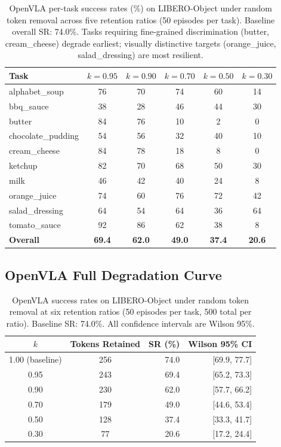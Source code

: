 \begin{table}[ht]
\centering
\small
\caption{OpenVLA per-task success rates (\%) on LIBERO-Object under random token removal across five retention ratios (50 episodes per task). Baseline overall SR: 74.0\%. Tasks requiring fine-grained discrimination (butter, cream\_cheese) degrade earliest; visually distinctive targets (orange\_juice, salad\_dressing) are most resilient.}
\label{tab:openvla_pertask}
\begin{tabular}{lccccc}
\toprule
Task & $k{=}0.95$ & $k{=}0.90$ & $k{=}0.70$ & $k{=}0.50$ & $k{=}0.30$ \\
\midrule
alphabet\_soup & 76 & 70 & 74 & 60 & 14 \\
bbq\_sauce & 38 & 28 & 46 & 44 & 30 \\
butter & 84 & 76 & 10 & 2 & 0 \\
chocolate\_pudding & 54 & 56 & 32 & 40 & 10 \\
cream\_cheese & 84 & 78 & 18 & 8 & 0 \\
ketchup & 82 & 70 & 68 & 50 & 30 \\
milk & 46 & 42 & 40 & 24 & 8 \\
orange\_juice & 74 & 60 & 76 & 72 & 42 \\
salad\_dressing & 64 & 54 & 64 & 36 & 64 \\
tomato\_sauce & 92 & 86 & 62 & 38 & 8 \\
\midrule
\textbf{Overall} & \textbf{69.4} & \textbf{62.0} & \textbf{49.0} & \textbf{37.4} & \textbf{20.6} \\
\bottomrule
\end{tabular}
\end{table}

\subsection{OpenVLA Full Degradation Curve}

\begin{table}[ht]
\centering
\small
\caption{OpenVLA success rates on LIBERO-Object under random token removal at six retention ratios (50 episodes per task, 500 total per ratio). Baseline SR: 74.0\%. All confidence intervals are Wilson 95\%.}
\label{tab:openvla_full}
\begin{tabular}{ccrr}
\toprule
$k$ & Tokens Retained & SR (\%) & Wilson 95\% CI \\
\midrule
1.00 (baseline) & 256 & 74.0 & [69.9, 77.7] \\
0.95 & 243 & 69.4 & [65.2, 73.3] \\
0.90 & 230 & 62.0 & [57.7, 66.2] \\
0.70 & 179 & 49.0 & [44.6, 53.4] \\
0.50 & 128 & 37.4 & [33.3, 41.7] \\
0.30 & 77 & 20.6 & [17.2, 24.4] \\
\bottomrule
\end{tabular}
\end{table}

